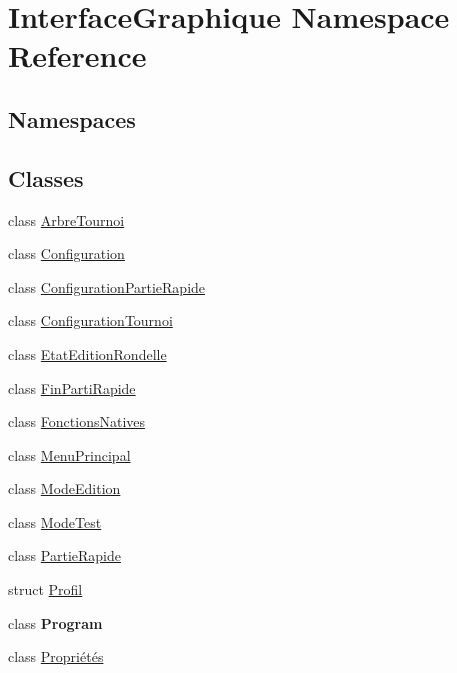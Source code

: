 \hypertarget{namespace_interface_graphique}{}\section{Interface\+Graphique Namespace Reference}
\label{namespace_interface_graphique}
\subsection*{Namespaces}
\begin{DoxyCompactItemize}
\end{DoxyCompactItemize}
\subsection*{Classes}
\begin{DoxyCompactItemize}
\item 
class \hyperlink{class_interface_graphique_1_1_arbre_tournoi}{Arbre\+Tournoi}
\item 
class \hyperlink{class_interface_graphique_1_1_configuration}{Configuration}
\item 
class \hyperlink{class_interface_graphique_1_1_configuration_partie_rapide}{Configuration\+Partie\+Rapide}
\item 
class \hyperlink{class_interface_graphique_1_1_configuration_tournoi}{Configuration\+Tournoi}
\item 
class \hyperlink{class_interface_graphique_1_1_etat_edition_rondelle}{Etat\+Edition\+Rondelle}
\item 
class \hyperlink{class_interface_graphique_1_1_fin_parti_rapide}{Fin\+Parti\+Rapide}
\item 
class \hyperlink{class_interface_graphique_1_1_fonctions_natives}{Fonctions\+Natives}
\item 
class \hyperlink{class_interface_graphique_1_1_menu_principal}{Menu\+Principal}
\item 
class \hyperlink{class_interface_graphique_1_1_mode_edition}{Mode\+Edition}
\item 
class \hyperlink{class_interface_graphique_1_1_mode_test}{Mode\+Test}
\item 
class \hyperlink{class_interface_graphique_1_1_partie_rapide}{Partie\+Rapide}
\item 
struct \hyperlink{struct_interface_graphique_1_1_profil}{Profil}
\item 
class {\bfseries Program}
\item 
class \hyperlink{class_interface_graphique_1_1_propri_xC3_xA9t_xC3_xA9s}{Propriétés}
\end{DoxyCompactItemize}
